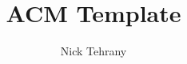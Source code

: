 \documentclass[sigconf]{acmart}
\begin{document}
\title{ACM Template}

\author{Nick Tehrany}

\renewcommand{\shortauthors}{Tehrany}

\begin{abstract}
\end{abstract}

\maketitle




\begin{acks}
\end{acks}

%


\end{document}
